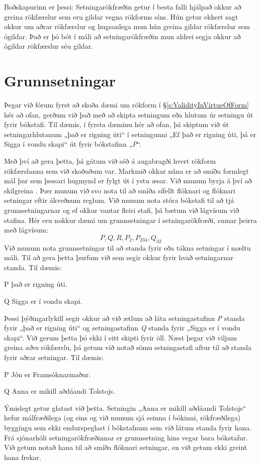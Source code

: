 Boðskapurinn er þessi: Setningarökfræðin getur í besta falli hjálpað okkur að greina rökfærslur sem eru gildar vegna rökforms síns. Hún getur ekkert sagt okkur um aðrar rökfærslur og hugsanlega mun hún greina gildar rökfærslur sem ógildar. Það er þó bót í máli að setningarökfræðin mun aldrei segja okkur að ógildar rökfærslur séu gildar.

\section{Grunnsetningar}

Þegar við fórum fyrst að skoða dæmi um rökform í \S\ref{s:ValidityInVirtueOfForm} hér að ofan, gerðum við það með að skipta setningum eða hlutum úr setningu út fyrir bókstafi. Til dæmis, í fyrsta dæminu hér að ofan, þá skiptum við út setningarhlutanum „það er rigning úti“ í setningunni „Ef það er rigning úti, þá er Sigga í vondu skapi“ út fyrir bókstafinn „\emph{P}“.

Með því að gera þetta, þá gátum við séð á augabragði hvert rökform rökfærslanna sem við skoðuðum var. Markmið okkar núna er að smíða formlegt mál þar sem þessari hugmynd er fylgt út í ystu æsar. Við munum byrja á því að skilgreina . Þær munum við svo nota til að smíða sífellt flóknari og flóknari setningar eftir ákveðnum reglum. Við munum nota stóra bókstafi til að tjá grunnsetningarnar og ef okkur vantar fleiri stafi, þá bætum við lágvísum við stafina. Hér eru nokkur dæmi um grunnsetningar í setningarökfræði, sumar þeirra með lágvísum:
	$$P, Q, R, P_2, P_{234}, Q_{32}$$
Við munum nota grunnsetningar til að standa fyrir eða tákna setningar í mæltu máli. Til að gera þetta þurfum við  sem segir okkur fyrir hvað setningarnar standa. Til dæmis:	
	
	\begin{ekey}
		\item[P] það er rigning úti.
		\item[Q] Sigga er í vondu skapi.
	\end{ekey}
Þessi þýðingarlykill segir okkur að við ætlum að láta setningastafinn \emph{P} standa fyrir „það er rigning úti“ og setningastafinn \emph{Q} standa fyrir „Sigga er í vondu skapi“. Við gerum þetta þó ekki í eitt skipti fyrir öll. Næst þegar við viljum greina \emph{aðra} rökfærslu, þá getum við notað sömu setningastafi aftur til að standa fyrir aðrar setningar. Til dæmis:
	\begin{ekey}
		\item[P] Jón er Framsóknarmaður.
		\item[Q] Anna er mikill aðdáandi Tolstojs.
	\end{ekey}
Ýmislegt getur glatast við þetta. Setningin „Anna er mikill aðdáandi Tolstojs“ hefur málfræðilega (og eins og við munum sjá seinna í bókinni, rökfræðilega) byggingu sem ekki endurspeglast í bókstafnum sem við látum standa fyrir hana. Frá sjónarhóli setningarökfræðinnar er grunnsetning hins vegar bara bókstafur. Við getum notað hana til að smíða flóknari setningar, en við getum ekki greint hana frekar.
	
